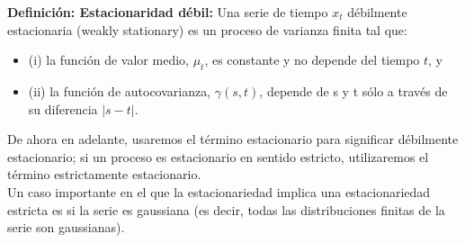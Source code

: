 %
\begin{definition}\label{def:def8}
	\textbf{Definici\'on: Estacionaridad d\'ebil:} Una serie de tiempo $x_t$ d\'ebilmente estacionaria (weakly stationary) es un proceso de varianza finita tal que:
			\begin{itemize}
				\item (i) la funci\'on de valor medio, $\mu_t$, es constante y no depende del tiempo $t$, y
				\item (ii) la funci\'on de autocovarianza, $\gamma(s, t)$, depende de s y t s\'olo a trav\'es de su diferencia $| s - t |$.
			\end{itemize}
\end{definition} 

De ahora en adelante, usaremos el t\'ermino estacionario para significar d\'ebilmente estacionario; si un proceso es estacionario en sentido estricto, utilizaremos el t\'ermino estrictamente estacionario.\\
Un caso importante en el que la estacionariedad implica una estacionariedad estricta es si la serie es gaussiana (es decir, todas las distribuciones finitas de la serie son gaussianas). 

